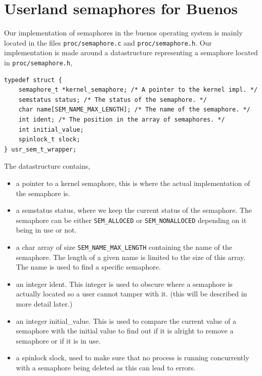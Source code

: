 \documentclass[11pt]{article}
\begin{document}
\section{Userland semaphores for Buenos}
    Our implementation of semaphores in the buenos operating system is mainly
    located in the files \texttt{proc/semaphore.c} and
    \texttt{proc/semaphore.h}.  Our implementation is made around a
    datastructure representing a semaphore located in \texttt{proc/semaphore.h},

    \begin{lstlisting}[style=customc]
typedef struct {
    semaphore_t *kernel_semaphore; /* A pointer to the kernel impl. */
    semstatus status; /* The status of the semaphore. */
    char name[SEM_NAME_MAX_LENGTH]; /* The name of the semaphore. */
    int ident; /* The position in the array of semaphores. */
    int initial_value;
    spinlock_t slock;
} usr_sem_t_wrapper;
    \end{lstlisting}

    The datastructure contains,

    \begin{itemize}
        \item a pointer to a kernel semaphore, this is where the actual
            implementation of the semaphore is.
        \item a semstatus status, where we keep the current status of the
            semaphore.  The semaphore can be either \texttt{SEM\_ALLOCED} or
            \texttt{SEM\_NONALLOCED} depending on it being in use or not.
        \item a char array of size \texttt{SEM\_NAME\_MAX\_LENGTH} containing the
            name of the semaphore.  The length of a given name is limited to
            the size of this array.  The name is used to find a specific
            semaphore.
        \item an integer ident.  This integer is used to obscure where a
            semaphore is actually located so a user cannot tamper with it. (this
            will be described in more detail later.)
        \item an integer initial\_value.  This is used to compare the current
            value of a semaphore with the initial value to find out if it is
            alright to remove a semaphore or if it is in use.
        \item a spinlock slock, used to make sure that no process is running
            concurrently with a semaphore being deleted as this can lead to
            errors.
    \end{itemize}
\end{document}
